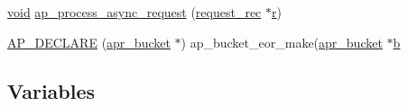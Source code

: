 \begin{DoxyCompactItemize}
\item 
\hyperlink{group__MOD__ISAPI_gacd6cdbf73df3d9eed42fa493d9b621a6}{void} \hyperlink{group__APACHE__CORE__REQ_gac4b59de5959473d7a72f98f8a274e50e}{ap\+\_\+process\+\_\+async\+\_\+request} (\hyperlink{structrequest__rec}{request\+\_\+rec} $\ast$\hyperlink{pcregrep_8txt_a2e9e9438b26c0bb4425367a7e4f75eb3}{r})
\item 
\hyperlink{group__APACHE__CORE__REQ_ga01a6148fa4c44ac51467376e00d48bfb}{A\+P\+\_\+\+D\+E\+C\+L\+A\+RE} (\hyperlink{structapr__bucket}{apr\+\_\+bucket} $\ast$) ap\+\_\+bucket\+\_\+eor\+\_\+make(\hyperlink{structapr__bucket}{apr\+\_\+bucket} $\ast$\hyperlink{group__APR__Util__Bucket__Brigades_ga11dc1bdeac74315dbed17465c98879e9}{b}
\end{DoxyCompactItemize}
\subsection*{Variables}
